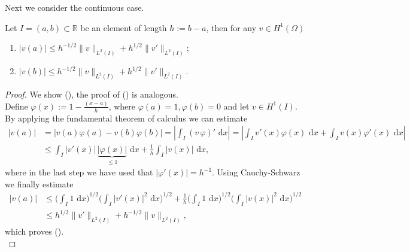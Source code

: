 Next we consider the continuous case.
\begin{lemma}
	\label{lemma:cont_trace_ineq}
	Let $I = (a,b) \subset \mathbb{R}$ be an element of length $h:= b-a$, then for any $v \in H^1(\Omega)$ 
	\begin{enumerate}[label=\textnormal{(\roman*)}]
		\item $\displaystyle |v(a)| \leq h^{-1/2} \|v\|_{L^2(I)} + h^{1/2} \|v'\|_{L^2(I)}; $
		\item $\displaystyle |v(b)| \leq h^{-1/2} \|v\|_{L^2(I)} + h^{1/2} \|v'\|_{L^2(I)}. $
	\end{enumerate} 
\end{lemma}
\begin{proof}
	We show (), the proof of () is analogous. \\
	Define $\varphi (x) := 1- \frac{(x-a)}{h}$, where $\varphi (a) = 1, \varphi (b) = 0$ and let $v \in H^1(I)$. By applying the fundamental theorem of calculus we can estimate 
	\begin{align*}
		|v(a)| &= | v(a)\varphi(a) - v(b)\varphi(b) | = | \int_{I} (v \, \varphi )' \text{ d} x| 
		= | \int_{I} v'(x) \varphi(x) \text{ d} x + \int_{I} v(x) \varphi'(x) \text{ d} x | \\
		& \leq \int_{I} |v'(x)| \,\underbrace{|\varphi(x) |}_{\leq 1} \text{ d}x + \frac{1}{h} \int_{I} |v(x)| \text{ d} x,
	\end{align*}
	where in the last step we have used that $\displaystyle | \varphi ' (x)| =h^{-1}$. Using Cauchy-Schwarz we finally estimate
	\begin{align*}
		|v(a)| &\leq \Big( \int_{I} 1 \text{ d} x \Big)^{1/2} \Big( \int_{I} |v'(x)|^2 \text{ d} x \Big)^{1/2}
		+ \frac{1}{h} \Big( \int_{I} 1 \text{ d} x \Big)^{1/2} \Big( \int_{I} |v(x)|^2 \text{ d} x \Big)^{1/2} \\
		& \leq h^{1/2} \| v'\|_{L^2(I)} + h^{-1/2} \| v\|_{L^2(I)},
	\end{align*}
	which proves (). \\
\end{proof}

